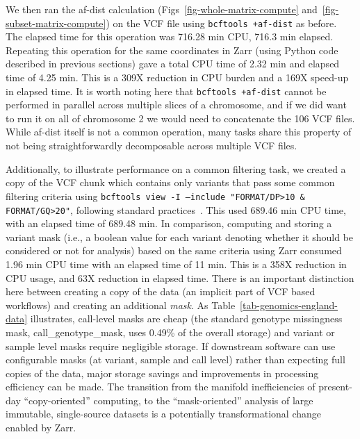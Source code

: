 \documentclass[a4paper,num-refs]{oup-contemporary}
\begin{document}
We then ran the af-dist calculation (Figs~\ref{fig-whole-matrix-compute}
and~\ref{fig-subset-matrix-compute}) on the VCF file
using \texttt{bcftools +af-dist} as before.
The elapsed time for this operation was 716.28 min CPU, 716.3 min elapsed.
Repeating this operation for the same coordinates in Zarr
(using Python code described in previous sections)
gave a total CPU time of 2.32 min and elapsed time of 4.25 min.
This is a 309X reduction in CPU burden and a 169X speed-up in elapsed time.
It is worth noting here that \texttt{bcftools +af-dist} cannot be
performed in parallel across multiple slices of a chromosome, and if
we did want to run it on all of chromosome 2 we would need to
concatenate the 106 VCF files. While af-dist itself is not a common operation,
many tasks share this property
of not being straightforwardly decomposable across multiple VCF files.

Additionally, to illustrate performance on a common filtering task, we
created a copy of the VCF chunk which contains only variants
that pass some common filtering criteria using
\texttt{bcftools view -I --include "FORMAT/DP>10 \& FORMAT/GQ>20"},
following standard practices~\citep[e.g.][]{bergstrom2020insights,
kousathanas2022whole,
chen2024genomic}.
This used 689.46 min CPU time, with an elapsed time of 689.48 min.
In comparison, computing and storing a variant mask (i.e., a boolean value
for each variant denoting whether it should be considered or not
for analysis) based on the same criteria using Zarr
consumed 1.96 min CPU time with an elapsed time of 11 min.
This is a 358X reduction in CPU usage, and 63X reduction in elapsed time.
There is an important distinction here between creating a copy
of the data (an implicit part of VCF based workflows) and creating an
additional \emph{mask}. As Table~\ref{tab-genomics-england-data}
illustrates, call-level masks are cheap (the standard
genotype missingness mask, call\_genotype\_mask, uses 0.49\% of the overall
storage) and variant or sample level masks require negligible storage.
If downstream software can
use configurable masks (at variant, sample and call level)
rather than expecting full copies of the data, major storage savings
and improvements in processing efficiency can be made.
The transition from the manifold inefficiencies of
present-day ``copy-oriented'' computing,
to the ``mask-oriented'' analysis of large immutable, single-source
datasets is a potentially transformational change enabled by Zarr.
\end{document}
